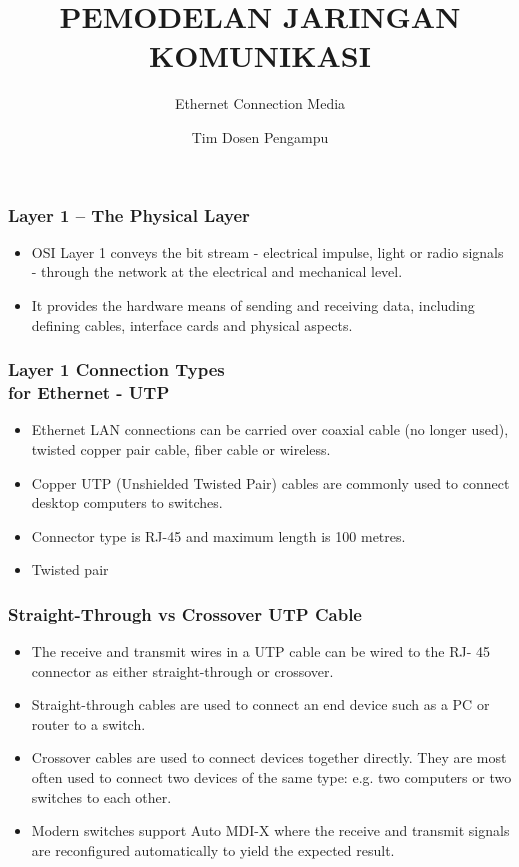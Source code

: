 \documentclass[pdflatex,compress,mathserif]{beamer}
\title{PEMODELAN JARINGAN KOMUNIKASI}
\subtitle{Ethernet Connection Media}
\author{Tim Dosen Pengampu}
\begin{document}
\maketitle

\begin{frame}
	\frametitle{Layer 1 – The Physical Layer}
	\begin{itemize}
		\item OSI Layer 1 conveys the bit stream - electrical impulse, light or radio signals - through the network at the electrical and mechanical level.
		\item It provides the hardware means of sending and receiving data, including defining cables, interface cards and physical aspects.
	\end{itemize}
\end{frame}

\begin{frame}
	\frametitle{Layer 1 Connection Types\\ for Ethernet - UTP}
	\begin{itemize}
		\item Ethernet LAN connections can be carried over coaxial cable (no longer used), twisted copper pair cable, fiber cable or wireless.
		\item Copper UTP (Unshielded Twisted Pair) cables are commonly used to connect desktop computers to switches.
		\item Connector type is RJ-45 and maximum length is 100 metres.
		\item Twisted pair \href{https://en.wikipedia.org/wiki/Twisted_pair}{}
	\end{itemize}
\end{frame}

\begin{frame}
	\frametitle{Straight-Through vs Crossover UTP Cable}
	\begin{itemize}
		\item The receive and transmit wires in a UTP cable can be wired to the RJ- 45 connector as either straight-through or crossover.
		\item Straight-through cables are used to connect an end device such as a PC or router to a switch.
		\item Crossover cables are used to connect devices together directly. They are most often used to connect two devices of the same type: e.g. two computers or two switches to each other.
		\item Modern switches support Auto MDI-X where the receive and transmit signals are reconfigured automatically to yield the expected result.
	\end{itemize}
\end{frame}
\end{document}
